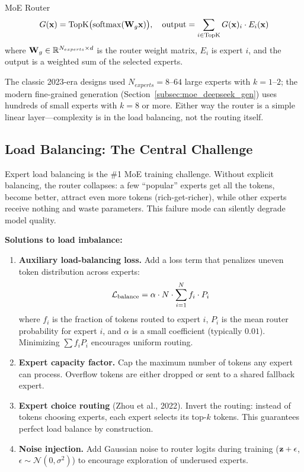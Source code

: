 \begin{mathresult}{MoE Router}
\begin{equation}
G(\mathbf{x}) = \text{TopK}\bigl(\operatorname{softmax}(\mathbf{W}_g \mathbf{x})\bigr), \quad \text{output} = \sum_{i \in \text{TopK}} G(\mathbf{x})_i \cdot E_i(\mathbf{x})
\end{equation}
where $\mathbf{W}_g \in \mathbb{R}^{N_{experts} \times d}$ is the router weight matrix, $E_i$ is expert $i$, and the output is a weighted sum of the selected experts.
\end{mathresult}

The classic 2023-era designs used $N_{experts} = 8\text{--}64$ large experts with $k = 1\text{--}2$; the modern fine-grained generation (Section~\ref{subsec:moe_deepseek_gen}) uses hundreds of small experts with $k = 8$ or more. Either way the router is a simple linear layer---complexity is in the load balancing, not the routing itself.

\subsection{Load Balancing: The Central Challenge}

\begin{warningbox}
Expert load balancing is the \#1 MoE training challenge. Without explicit balancing, the router collapses: a few ``popular'' experts get all the tokens, become better, attract even more tokens (rich-get-richer), while other experts receive nothing and waste parameters. This failure mode can silently degrade model quality.
\end{warningbox}

\textbf{Solutions to load imbalance:}

\begin{enumerate}
    \item \textbf{Auxiliary load-balancing loss.} Add a loss term that penalizes uneven token distribution across experts:
    \begin{equation}
    \mathcal{L}_{\text{balance}} = \alpha \cdot N \cdot \sum_{i=1}^{N} f_i \cdot P_i
    \end{equation}
    where $f_i$ is the fraction of tokens routed to expert $i$, $P_i$ is the mean router probability for expert $i$, and $\alpha$ is a small coefficient (typically $0.01$). Minimizing $\sum f_i P_i$ encourages uniform routing.

    \item \textbf{Expert capacity factor.} Cap the maximum number of tokens any expert can process. Overflow tokens are either dropped or sent to a shared fallback expert.

    \item \textbf{Expert choice routing} (Zhou et al., 2022). Invert the routing: instead of tokens choosing experts, each expert selects its top-$k$ tokens. This guarantees perfect load balance by construction.

    \item \textbf{Noise injection.} Add Gaussian noise to router logits during training ($\mathbf{z} + \epsilon$, $\epsilon \sim \mathcal{N}(0, \sigma^2)$) to encourage exploration of underused experts.
\end{enumerate}

